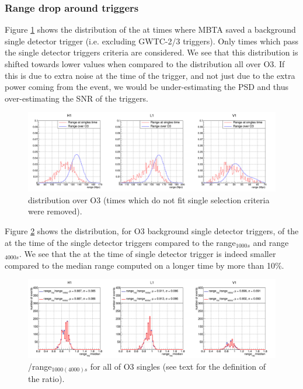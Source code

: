 
\subsubsection{Range drop around triggers}

Figure \ref{fig:rangeO3} shows the distribution of the \medr{} at times where MBTA saved a background single detector trigger (i.e. excluding GWTC-2/3 triggers).
Only times which pass the single detector triggers criteria are considered.
We see that this distribution is shifted towards lower values when compared to the \medr{} distribution all over O3.
If this is due to extra noise at the time of the trigger, and not just due to the extra power coming from the event, we would be under-estimating the PSD and thus over-estimating the SNR of the triggers.
\begin{figure}[H]
  \centering
  \includegraphics[width=\linewidth]{sectionBadTriggers/PSD/Range/range_ratio/cRangeO3_allCuts.png}
  \caption{\medr{} distribution over O3 (times which do not fit single selection criteria were removed).}
  \label{fig:rangeO3}
\end{figure}

Figure \ref{fig:rangeRatioO3} shows the distribution, for O3 background single detector triggers, of the \medr{} at the time of the single detector triggers compared to the range$_{1000s}$ and range$_{4000s}$.
We see that the \medr{} at the time of single detector trigger is indeed smaller compared to the median range computed on a longer time by more than 10\%.
\begin{figure}[H]
  \centering
  \includegraphics[width=\linewidth]{sectionBadTriggers/PSD/Range/range_ratio/cRatioMed_O3.png}
  \caption{\medr{}/range$_{1000(4000)s}$ for all of O3 singles (see text for the definition of the ratio).}
  \label{fig:rangeRatioO3}
\end{figure}

